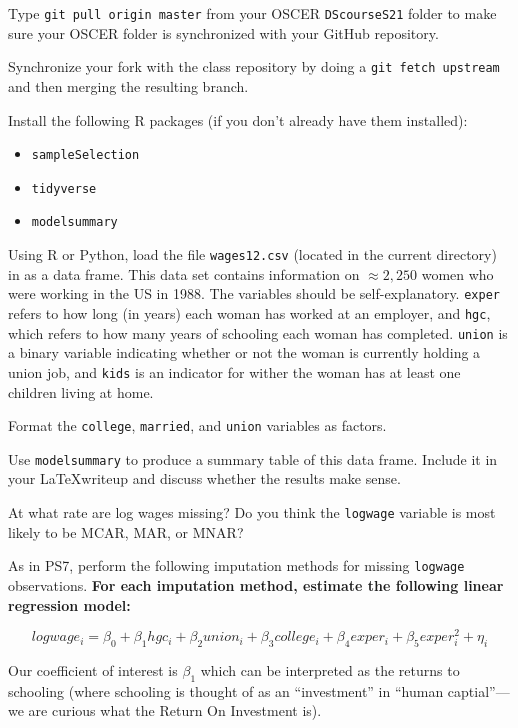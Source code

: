 \documentclass[12pt,english]{exam}
\begin{document}
\begin{questions}
\question Type \texttt{git pull origin master} from your OSCER \texttt{DScourseS21} folder to make sure your OSCER folder is synchronized with your GitHub repository. 

\question Synchronize your fork with the class repository by doing a \texttt{git fetch upstream} and then merging the resulting branch. 

\question Install the following R packages (if you don't already have them installed):
\begin{itemize}
    \item \texttt{sampleSelection}
    \item \texttt{tidyverse}
    \item \texttt{modelsummary}
\end{itemize}

\question Using R or Python, load the file \texttt{wages12.csv} (located in the current directory) in as a data frame. This data set contains information on $\approx 2,250$ women who were working in the US in 1988. The variables should be self-explanatory. \texttt{exper} refers to how long (in years) each woman has worked at an employer, and \texttt{hgc}, which refers to how many years of schooling each woman has completed. \texttt{union} is a binary variable indicating whether or not the woman is currently holding a union job, and \texttt{kids} is an indicator for wither the woman has at least one children living at home.

\question Format the \texttt{college}, \texttt{married}, and \texttt{union} variables as factors.

\question Use \texttt{modelsummary} to produce a summary table of this data frame. Include it in your \LaTeX writeup and discuss whether the results make sense.

At what rate are log wages missing? Do you think the \texttt{logwage} variable is most likely to be MCAR, MAR, or MNAR?

\question As in PS7, perform the following imputation methods for missing \texttt{logwage} observations. \textbf{For each imputation method, estimate the following linear regression model:}

\[
    logwage_{i} = \beta_{0} +  \beta_{1}hgc_{i} + \beta_{2}union_{i} + \beta_{3}college_{i} + \beta_{4}exper_{i} + \beta_{5}exper^{2}_{i} + \eta_{i}
\]

Our coefficient of interest is $\beta_{1}$ which can be interpreted as the returns to schooling (where schooling is thought of as an ``investment'' in ``human captial''---we are curious what the Return On Investment is).


\end{questions}
\end{document}
